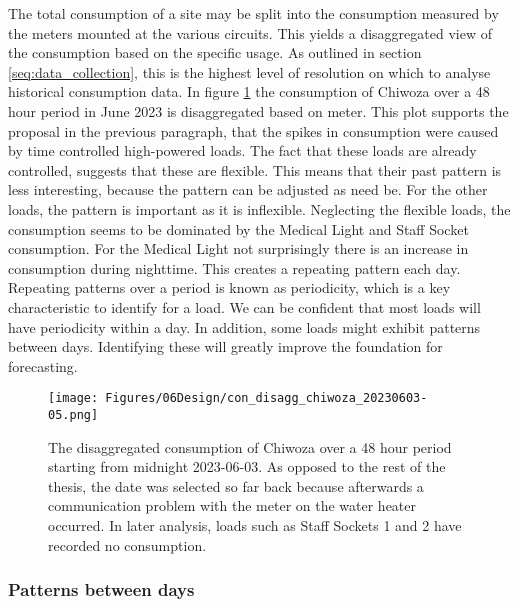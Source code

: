 The total consumption of a site may be split into the consumption measured by the meters mounted at the various circuits. This yields a disaggregated view of the consumption based on the specific usage. As outlined in section \ref{seq:data_collection}, this is the highest level of resolution on which to analyse historical consumption data. In figure \ref{fig:con_disagg_chiwoza_20230603-05} the consumption of Chiwoza over a 48 hour period in June 2023 is disaggregated based on meter. This plot supports the proposal in the previous paragraph, that the spikes in consumption were caused by time controlled high-powered loads. The fact that these loads are already controlled, suggests that these are flexible. This means that their past pattern is less interesting, because the pattern can be adjusted as need be. For the other loads, the pattern is important as it is inflexible. Neglecting the flexible loads, the consumption seems to be dominated by the Medical Light and Staff Socket consumption. For the Medical Light not surprisingly there is an increase in consumption during nighttime. This creates a repeating pattern each day. Repeating patterns over a period is known as periodicity, which is a key characteristic to identify for a load. We can be confident that most loads will have periodicity within a day. In addition, some loads might exhibit patterns between days. Identifying these will greatly improve the foundation for forecasting.\\ 

\begin{figure}[h]
    \centering
    \texttt{[image: Figures/06Design/con\_disagg\_chiwoza\_20230603-05.png]}
    \caption[Disaggregated Consumption Chiwoza 20230603-05]{The disaggregated consumption of Chiwoza over a 48 hour period starting from midnight 2023-06-03. As opposed to the rest of the thesis, the date was selected so far back because afterwards a communication problem with the meter on the water heater occurred. In later analysis, loads such as Staff Sockets 1 and 2 have recorded no consumption. }
    \label{fig:con_disagg_chiwoza_20230603-05}
\end{figure}

\subsubsection{Patterns between days}\label{seq:periodicity}

